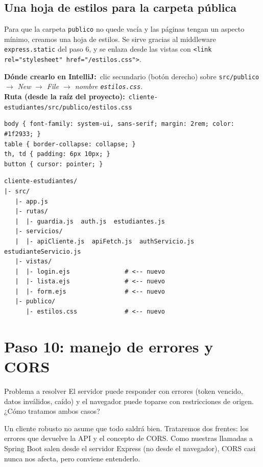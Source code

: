 \documentclass[11pt]{article}
\newcommand{\dondecrear}[3]{\begin{ubic}{\footnotesize\textbf{\color{ndverdeo}D\'onde crearlo en IntelliJ:}~clic secundario (bot\'on derecho) sobre \texttt{#1} $\rightarrow$ \emph{New} $\rightarrow$ \emph{#2}.\\[2pt]\textbf{\color{ndverdeo}Ruta (desde la ra\'iz del proyecto):}~\texttt{#3}}\end{ubic}\nobreak\vspace{3pt}}
\begin{document}
\subsection{Una hoja de estilos para la carpeta pública}
Para que la carpeta \texttt{publico} no quede vacía y las páginas tengan un aspecto mínimo, creamos una hoja de estilos. Se sirve gracias al middleware \texttt{express.\allowbreak{}static} del paso 6, y se enlaza desde las vistas con \texttt{<link rel="stylesheet" href="/estilos.css">}.

\dondecrear{src/publico}{File $\rightarrow$ nombre \texttt{estilos.css}}{cliente-estudiantes/src/publico/estilos.css}
\begin{cajacodigo}
\begin{lstlisting}[style=markup]
body { font-family: system-ui, sans-serif; margin: 2rem; color: #1f2933; }
table { border-collapse: collapse; }
th, td { padding: 6px 10px; }
button { cursor: pointer; }
\end{lstlisting}
\end{cajacodigo}
\vspace{2pt}

\begin{cajacodigo}
\begin{lstlisting}[style=markup]
cliente-estudiantes/
|- src/
   |- app.js
   |- rutas/
   |  |- guardia.js  auth.js  estudiantes.js
   |- servicios/
   |  |- apiCliente.js  apiFetch.js  authServicio.js  estudianteServicio.js
   |- vistas/
   |  |- login.ejs               # <-- nuevo
   |  |- lista.ejs               # <-- nuevo
   |  |- form.ejs                # <-- nuevo
   |- publico/
      |- estilos.css             # <-- nuevo
\end{lstlisting}
\end{cajacodigo}
\vspace{2pt}

\section{Paso 10: manejo de errores y CORS}
\begin{cajaproblema}{Problema a resolver}
El servidor puede responder con errores (token vencido, datos inválidos, caído) y el navegador puede toparse con restricciones de origen. ¿Cómo tratamos ambos casos?\par
\end{cajaproblema}
Un cliente robusto no asume que todo saldrá bien. Trataremos dos frentes: los errores que devuelve la API y el concepto de CORS. Como nuestras llamadas a Spring Boot salen desde el servidor Express (no desde el navegador), CORS casi nunca nos afecta, pero conviene entenderlo.
\end{document}
